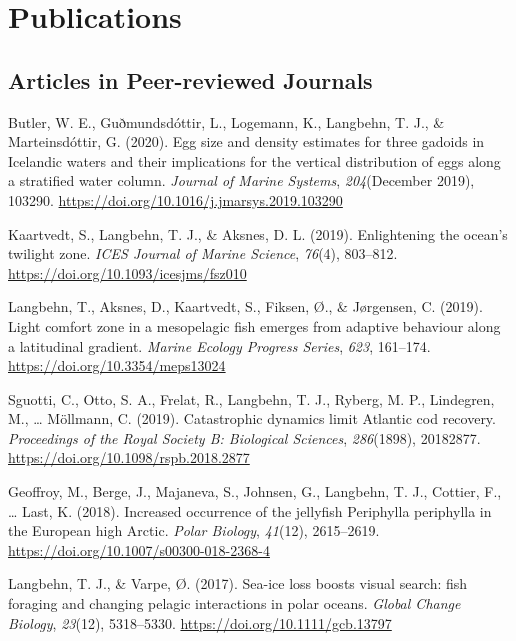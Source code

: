 \documentclass[11pt, a4paper]{awesome-cv}
\begin{document}
\hypertarget{publications}{%
\section{Publications}\label{publications}}

\hypertarget{articles-in-peer-reviewed-journals}{%
\subsection{Articles in Peer-reviewed
Journals}\label{articles-in-peer-reviewed-journals}}

\hypertarget{refs_journals}{}
\leavevmode\hypertarget{ref-Butler2020}{}%
Butler, W. E., Guðmundsdóttir, L., Logemann, K., Langbehn, T. J., \&
Marteinsdóttir, G. (2020). Egg size and density estimates for three
gadoids in Icelandic waters and their implications for the vertical
distribution of eggs along a stratified water column. \emph{Journal of
Marine Systems}, \emph{204}(December 2019), 103290.
\url{https://doi.org/10.1016/j.jmarsys.2019.103290}

\leavevmode\hypertarget{ref-Kaartvedt2019b}{}%
Kaartvedt, S., Langbehn, T. J., \& Aksnes, D. L. (2019). Enlightening
the ocean's twilight zone. \emph{ICES Journal of Marine Science},
\emph{76}(4), 803--812. \url{https://doi.org/10.1093/icesjms/fsz010}

\leavevmode\hypertarget{ref-Langbehn2019a}{}%
Langbehn, T., Aksnes, D., Kaartvedt, S., Fiksen, Ø., \& Jørgensen, C.
(2019). Light comfort zone in a mesopelagic fish emerges from adaptive
behaviour along a latitudinal gradient. \emph{Marine Ecology Progress
Series}, \emph{623}, 161--174. \url{https://doi.org/10.3354/meps13024}

\leavevmode\hypertarget{ref-Sguotti}{}%
Sguotti, C., Otto, S. A., Frelat, R., Langbehn, T. J., Ryberg, M. P.,
Lindegren, M., \ldots{} Möllmann, C. (2019). Catastrophic dynamics limit
Atlantic cod recovery. \emph{Proceedings of the Royal Society B:
Biological Sciences}, \emph{286}(1898), 20182877.
\url{https://doi.org/10.1098/rspb.2018.2877}

\leavevmode\hypertarget{ref-Geoffroy2018}{}%
Geoffroy, M., Berge, J., Majaneva, S., Johnsen, G., Langbehn, T. J.,
Cottier, F., \ldots{} Last, K. (2018). Increased occurrence of the
jellyfish Periphylla periphylla in the European high Arctic. \emph{Polar
Biology}, \emph{41}(12), 2615--2619.
\url{https://doi.org/10.1007/s00300-018-2368-4}

\leavevmode\hypertarget{ref-Langbehn2017}{}%
Langbehn, T. J., \& Varpe, Ø. (2017). Sea-ice loss boosts visual search:
fish foraging and changing pelagic interactions in polar oceans.
\emph{Global Change Biology}, \emph{23}(12), 5318--5330.
\url{https://doi.org/10.1111/gcb.13797}
\end{document}

